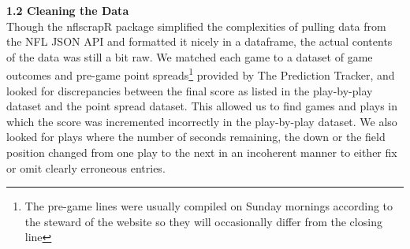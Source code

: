 \documentclass[12pt,twoside]{dukestatscithesis}
\begin{document}
\textbf{1.2 Cleaning the Data}\\
Though the nflscrapR package simplified the complexities of pulling data from the NFL JSON API and formatted it nicely in a dataframe, the actual contents of the data was still a bit raw. We matched each game to a dataset of game outcomes and pre-game point spreads\footnote{The pre-game lines were usually compiled on Sunday mornings according to the steward of the website so they will occasionally differ from the closing line} provided by The Prediction Tracker, and looked for discrepancies between the final score as listed in the play-by-play dataset and the point spread dataset. This allowed us to find games and plays in which the score was incremented incorrectly in the play-by-play dataset. We also looked for plays where the number of seconds remaining, the down or the field position changed from one play to the next in an incoherent manner to either fix or omit clearly erroneous entries.
\end{document}
